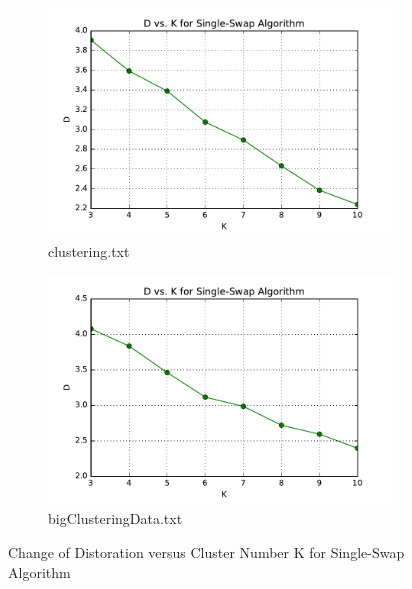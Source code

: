 \begin{figure}[H]
\centering
\centering
        \begin{subfigure}[b]{0.49\textwidth}
            \centering
            \includegraphics[width=\textwidth]{./figures/loss_clustering_singleSwap.pdf}
            \caption{clustering.txt}\label{fig:9a}
        \end{subfigure}
        \hfill
        \begin{subfigure}[b]{0.49\textwidth}  
            \centering 
            \includegraphics[width=\textwidth]{./figures/loss_bigClustering_singleSwap.pdf}
            \caption{bigClusteringData.txt}\label{fig:9b}
        \end{subfigure}
\caption{Change of Distoration versus Cluster Number K for Single-Swap Algorithm}
\label{fig:k-means-loss} 
\end{figure}

